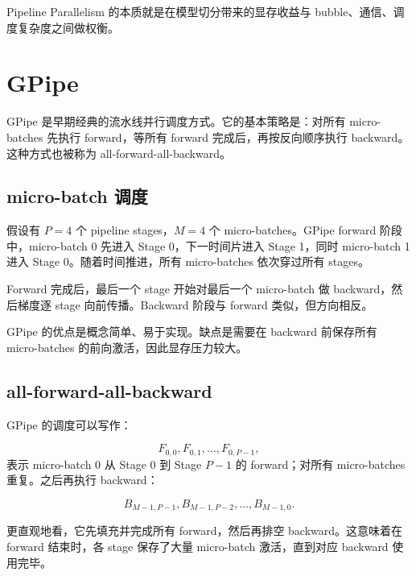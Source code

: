Pipeline Parallelism 的本质就是在模型切分带来的显存收益与 bubble、通信、调度复杂度之间做权衡。

\section{GPipe}
\label{sec:gpipe}

GPipe 是早期经典的流水线并行调度方式。它的基本策略是：对所有 micro-batches 先执行 forward，等所有 forward 完成后，再按反向顺序执行 backward。这种方式也被称为 all-forward-all-backward。

\subsection{micro-batch 调度}
\label{subsec:gpipe-microbatch-scheduling}

假设有 $P=4$ 个 pipeline stages，$M=4$ 个 micro-batches。GPipe forward 阶段中，micro-batch 0 先进入 Stage 0，下一时间片进入 Stage 1，同时 micro-batch 1 进入 Stage 0。随着时间推进，所有 micro-batches 依次穿过所有 stages。

Forward 完成后，最后一个 stage 开始对最后一个 micro-batch 做 backward，然后梯度逐 stage 向前传播。Backward 阶段与 forward 类似，但方向相反。

GPipe 的优点是概念简单、易于实现。缺点是需要在 backward 前保存所有 micro-batches 的前向激活，因此显存压力较大。

\subsection{all-forward-all-backward}
\label{subsec:all-forward-all-backward}

GPipe 的调度可以写作：

\[
F_{0,0},F_{0,1},\ldots,F_{0,P-1},
\]
表示 micro-batch 0 从 Stage 0 到 Stage $P-1$ 的 forward；对所有 micro-batches 重复。之后再执行 backward：

\[
B_{M-1,P-1},B_{M-1,P-2},\ldots,B_{M-1,0}.
\]

更直观地看，它先填充并完成所有 forward，然后再排空 backward。这意味着在 forward 结束时，各 stage 保存了大量 micro-batch 激活，直到对应 backward 使用完毕。

